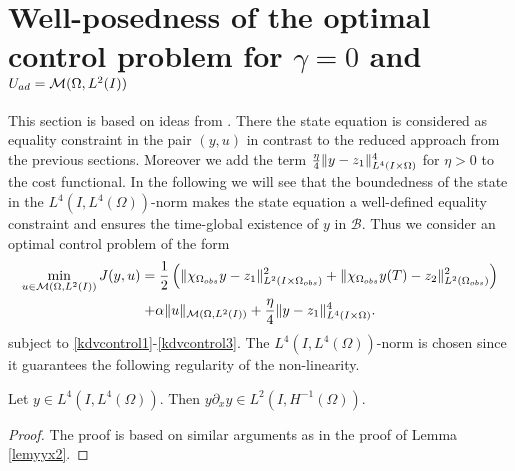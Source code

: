 \section{Well-posedness of the optimal control problem for $\gamma=0$ and $U_{ad}=\mathcal{M}(\Omega, L^{2}(I))$}
\label{wp2}
This section is based on ideas from \cite{lions1985control}. There the state equation is considered as equality constraint in the pair $(y,u)$ in contrast to the reduced approach from the previous sections. Moreover we add the term $\frac{\eta}{4} \lVert y - z_1\rVert_{L^4(I\times \Omega)}^4$ for $\eta >0$ to the cost functional. In the following we will see that the boundedness of the state in the $L^4(I,L^4(\Omega))$-norm makes the state equation a well-defined equality constraint and ensures the time-global existence of $y$ in $\mathcal B$. Thus we consider an optimal control problem of the form
\begin{multline}
\min_{u \in \mathcal{M}(\Omega, L^{2}(I))}J(y,u)=\frac{1}{2}\left(\lVert\chi_{\Omega_{obs}}y - z_1\rVert_{L^2(I\times \Omega_{obs})}^2+\|\chi_{\Omega_{obs}}y(T)-z_2\|_{L^2(\Omega_{obs})}^2\right) \\+ \alpha \lVert u\rVert_{\mathcal{M}(\Omega, L^{2}(I))} + \frac{\eta}{4} \lVert y - z_1\rVert_{L^4(I\times \Omega)}^4.
\label{cost2}
\end{multline}
subject to \eqref{kdvcontrol1}-\eqref{kdvcontrol3}. The $L^4(I,L^4(\Omega))$-norm is chosen since it guarantees the following regularity of the non-linearity.  
\begin{lem}
\label{lemyyxL4}
 Let $y \in L^4(I,L^4(\Omega))$. Then $y \partial_x y \in L^2(I,H^{-1}(\Omega))$.
\end{lem}
\begin{proof}
The proof is based on similar arguments as in the proof of Lemma \ref{lemyyx2}.
\end{proof}
